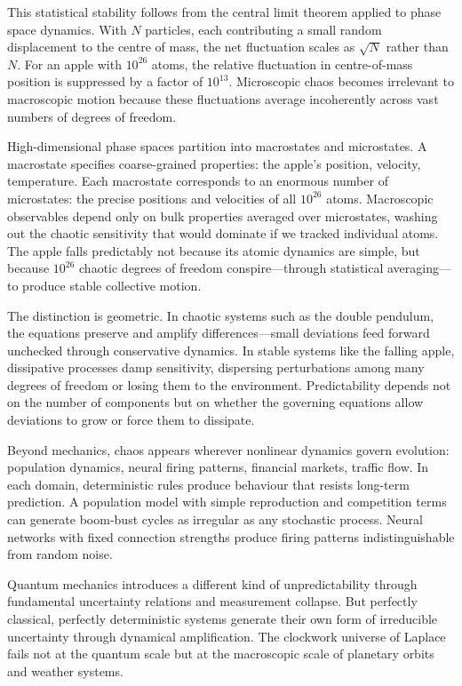 This statistical stability follows from the central limit theorem applied to phase space dynamics. With $N$ particles, each contributing a small random displacement to the centre of mass, the net fluctuation scales as $\sqrt{N}$ rather than $N$. For an apple with $10^{26}$ atoms, the relative fluctuation in centre-of-mass position is suppressed by a factor of $10^{13}$. Microscopic chaos becomes irrelevant to macroscopic motion because these fluctuations average incoherently across vast numbers of degrees of freedom.

High-dimensional phase spaces partition into macrostates and microstates. A macrostate specifies coarse-grained properties: the apple's position, velocity, temperature. Each macrostate corresponds to an enormous number of microstates: the precise positions and velocities of all $10^{26}$ atoms. Macroscopic observables depend only on bulk properties averaged over microstates, washing out the chaotic sensitivity that would dominate if we tracked individual atoms. The apple falls predictably not because its atomic dynamics are simple, but because $10^{26}$ chaotic degrees of freedom conspire—through statistical averaging—to produce stable collective motion.

The distinction is geometric. In chaotic systems such as the double pendulum, the equations preserve and amplify differences—small deviations feed forward unchecked through conservative dynamics. In stable systems like the falling apple, dissipative processes damp sensitivity, dispersing perturbations among many degrees of freedom or losing them to the environment. Predictability depends not on the number of components but on whether the governing equations allow deviations to grow or force them to dissipate.

Beyond mechanics, chaos appears wherever nonlinear dynamics govern evolution: population dynamics, neural firing patterns, financial markets, traffic flow. In each domain, deterministic rules produce behaviour that resists long-term prediction. A population model with simple reproduction and competition terms can generate boom-bust cycles as irregular as any stochastic process. Neural networks with fixed connection strengths produce firing patterns indistinguishable from random noise.

Quantum mechanics introduces a different kind of unpredictability through fundamental uncertainty relations and measurement collapse. But perfectly classical, perfectly deterministic systems generate their own form of irreducible uncertainty through dynamical amplification. The clockwork universe of Laplace fails not at the quantum scale but at the macroscopic scale of planetary orbits and weather systems.

